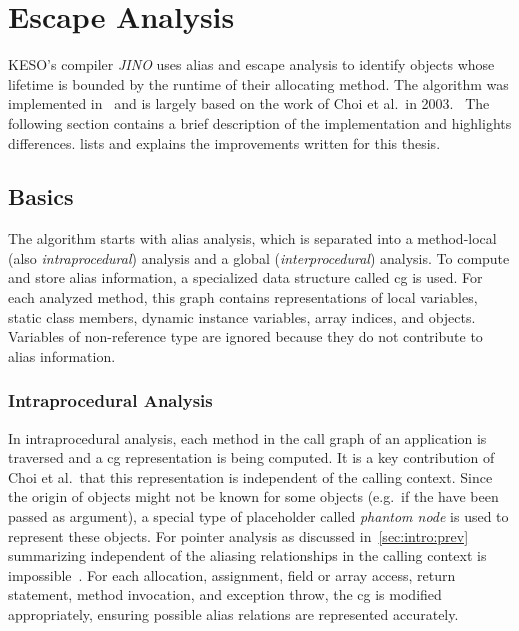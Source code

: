 
\chapter{Escape Analysis}
	\label{chapter:ea}
	KESO's compiler \emph{JINO} uses alias and escape analysis to identify objects whose lifetime is bounded by the
	runtime of their allocating method. The algorithm was implemented in~\cite{lang:12} and is largely based on the work
	of Choi et al.\ in 2003.~\cite{choi:03} The following section contains a brief description of the implementation and
	highlights differences.  lists and explains the improvements written for this thesis.

	\section{Basics}
		\label{sec:ea:basics}
		The algorithm starts with alias analysis, which is separated into a method-local (also \emph{intraprocedural})
		analysis and a global (\emph{interprocedural}) analysis. To compute and store alias information, a specialized data
		structure called \gls{cg} is used. For each analyzed method, this graph contains representations of local variables,
		static class members, dynamic instance variables, array indices, and objects. Variables of non-reference type are
		ignored because they do not contribute to alias information.

		\subsection{Intraprocedural Analysis}
			\label{sub:ea:basics:local}
			In intraprocedural analysis, each method in the call graph of an application is traversed and a \gls{cg}
			representation is being computed. It is a key contribution of Choi et al.\ that this representation is independent
			of the calling context. Since the origin of objects might not be known for some objects (e.g.\ if the have been
			passed as argument), a special type of placeholder called \emph{phantom node} is used to represent these objects.
			For pointer analysis as discussed in~\cref{sec:intro:prev} summarizing independent of the aliasing relationships
			in the calling context is impossible~\cite[p.~886]{choi:03}. For each allocation, assignment, field or array
			access, return statement, method invocation, and exception throw, the \gls{cg} is modified appropriately, ensuring
			possible alias relations are represented accurately.

